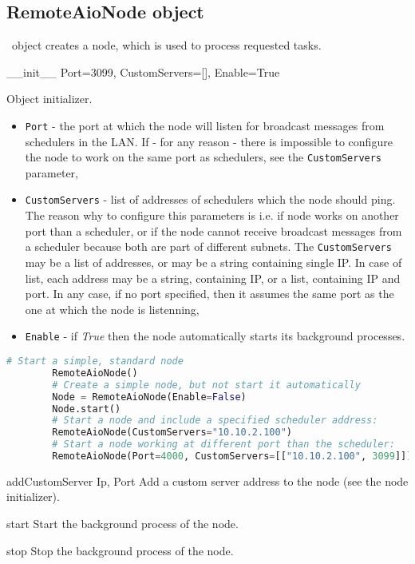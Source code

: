 \subsection{RemoteAioNode object}

\RemoteAioNode\ object creates a node, which is used to process requested tasks.

 {\_\_init\_\_} {Port=3099, CustomServers=[], Enable=True} {
	Object initializer.
	\begin{itemize}
		\item \texttt{Port} - the port at which the node will listen for broadcast messages from schedulers in the LAN. If - for any reason - there is impossible to configure the node to work on the same port as schedulers, see the \texttt{CustomServers} parameter,
		\item \texttt{CustomServers} - list of addresses of schedulers which the node should ping. The reason why to configure this parameters is i.e. if node works on another port than a scheduler, or if the node cannot receive broadcast messages from a scheduler because both are part of different subnets. The \texttt{CustomServers} may be a list of addresses, or may be a string containing single IP. In case of list, each address may be a string, containing IP, or a list, containing IP and port. In any case, if no port specified, then it assumes the same port as the one at which the node is listenning,
		\item \texttt{Enable} - if \textit{True} then the node automatically starts its background processes.
	\end{itemize}
}
\begin{lstlisting}[language=Python]
		# Start a simple, standard node
		RemoteAioNode()
		# Create a simple node, but not start it automatically
		Node = RemoteAioNode(Enable=False)
		Node.start()
		# Start a node and include a specified scheduler address:
		RemoteAioNode(CustomServers="10.10.2.100")
		# Start a node working at different port than the scheduler:
		RemoteAioNode(Port=4000, CustomServers=[["10.10.2.100", 3099]])
\end{lstlisting}

 {addCustomServer} {Ip, Port} {
	Add a custom server address to the node (see the node initializer).
}

 {start} {} {
	Start the background process of the node.
}

 {stop} {} {
	Stop the background process of the node.
}

